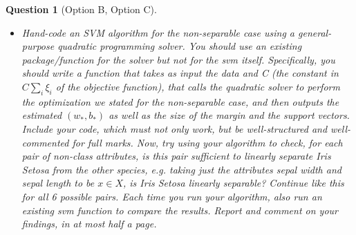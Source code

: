 \documentclass[12pt]{article}
\newtheorem{question}{Question}
\begin{document}
\begin{question}[Option B, Option C]
  \begin{itemize}
  \item 
    Hand-code an SVM algorithm for the non-separable case using a general-purpose quadratic programming solver. You should use an existing package/function for the solver but not for the svm itself. Specifically, you should write a function that takes as input the data and C (the constant in $C \sum\limits_i \xi_i$ of the objective function), that calls the quadratic solver to perform the optimization we stated for the non-separable case, and then outputs the estimated $(w_*, b_*)$ as well as the size of the margin and the support vectors. Include your code, which must not only work, but be well-structured and well-commented for full marks. Now, try using your algorithm to check, for each pair of non-class attributes, is this pair sufficient to linearly separate Iris Setosa from the other species, e.g. taking just the attributes sepal width and sepal length to be $x \in X$, is Iris Setosa linearly separable? Continue like this for all 6 possible pairs. Each time you run your algorithm, also run an existing svm function to compare the results. Report and comment on your findings, in at most half a page.
  \end{itemize}
\end{question}
\end{document}
